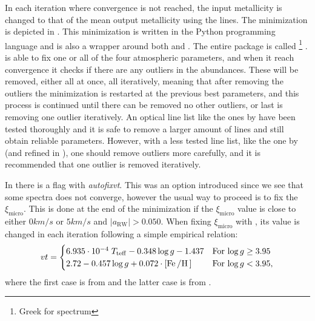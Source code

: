 In each iteration where convergence is not reached, the input metallicity is
changed to that of the mean output metallicity using the  lines. The
minimization is depicted in . This minimization is
written in the Python programming language and is also a wrapper around both
\ARES and \MOOG. The entire package is called \FASMA\footnote{Greek for
spectrum} \citep{Andreasen2017a, Tsantaki2017}. \FASMA is able to fix one or all
of the four atmospheric parameters, and when it reach convergence it checks if
there are any outliers in the abundances. These will be removed, either all at
once, all iteratively, meaning that after removing the outliers the minimization
is restarted at the previous best parameters, and this process is continued
until there can be removed no other outliers, or last is removing one outlier
iteratively. An optical line list like the ones by
\citet{Sousa2008a,Tsantaki2013} have been tested thoroughly and it is safe to
remove a larger amount of lines and still obtain reliable parameters. However,
with a less tested line list, like the one by \citet{Andreasen2016} (and refined
in \citet{Andreasen2017b}), one should remove outliers more carefully, and it is
recommended that one outlier is removed iteratively.

In  there is a flag with \emph{autofixvt}. This was an
option introduced since we see that some spectra does not converge, however the
usual way to proceed is to fix the $\xi_\mathrm{micro}$. This is done at the end
of the minimization if the $\xi_\mathrm{micro}$ value is close to either
$0\si{km/s}$ or $5\si{km/s}$ and $|a_\mathrm{RW}| > 0.050$. When fixing
$\xi_\mathrm{micro}$ with \FASMA, its value is changed in each iteration
following a simple empirical relation:
\begin{align}
  vt = \begin{cases}
    6.935 \cdot 10^{-4}\; T_\mathrm{teff} - 0.348 \log g - 1.437     & \text{For $\log g \ge 3.95$} \\
    2.72 - 0.457 \log g + 0.072 \cdot [\ion{Fe}/\ion{H}]             & \text{For $\log g < 3.95$},
\end{cases}
\end{align}
where the first case is from \citet{Tsantaki2013} and the latter case is from
\citet{Adibekyan2015}.

